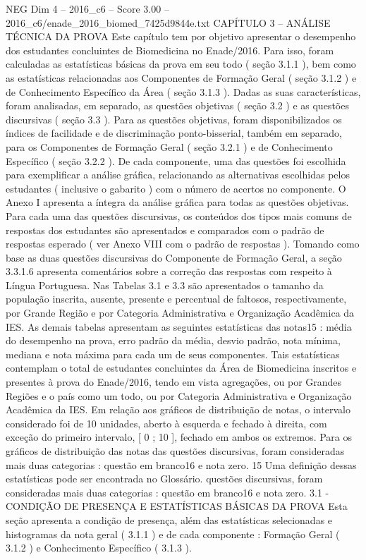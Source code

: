 \begin{textsample}{NEG Dim 4 – 2016\_c6 – Score 3.00 – 2016\_c6/enade\_2016\_biomed\_7425d9844e.txt}  \label{ex:f4_neg_301}
CAPÍTULO 3 – ANÁLISE TÉCNICA DA PROVA Este capítulo tem por objetivo apresentar o desempenho dos estudantes concluintes de Biomedicina no Enade/2016.
Para isso, foram calculadas as estatísticas básicas da prova em seu todo ( seção 3.1.1 ), bem como as estatísticas relacionadas aos Componentes de Formação Geral ( seção 3.1.2 ) e de Conhecimento Específico da Área ( seção 3.1.3 ).
Dadas as suas características, foram analisadas, em separado, as questões objetivas ( seção 3.2 ) e as questões discursivas ( seção 3.3 ).
Para as questões objetivas, foram disponibilizados os índices de facilidade e de discriminação ponto-bisserial, também em separado, para os Componentes de Formação Geral ( seção 3.2.1 ) e de Conhecimento Específico ( seção 3.2.2 ).
De cada componente, uma das questões foi escolhida para exemplificar a análise gráfica, relacionando as alternativas escolhidas pelos estudantes ( inclusive o gabarito ) com o número de acertos no componente.
O Anexo I apresenta a íntegra da análise gráfica para todas as questões objetivas.
Para cada uma das questões discursivas, os conteúdos dos tipos mais comuns de respostas dos estudantes são apresentados e comparados com o padrão de respostas esperado ( ver Anexo VIII com o padrão de respostas ).
Tomando como base as duas questões discursivas do Componente de Formação Geral, a seção 3.3.1.6 apresenta comentários sobre a correção das respostas com respeito à Língua Portuguesa.
Nas Tabelas 3.1 e 3.3 são apresentados o tamanho da população inscrita, ausente, presente e percentual de faltosos, respectivamente, por Grande Região e por Categoria Administrativa e Organização Acadêmica da IES.
As demais tabelas apresentam as seguintes estatísticas das notas15 : média do desempenho na prova, erro padrão da média, desvio padrão, nota mínima, mediana e nota máxima para cada um de seus componentes.
Tais estatísticas contemplam o total de estudantes concluintes da Área de Biomedicina inscritos e presentes à prova do Enade/2016, tendo em vista agregações, ou por Grandes Regiões e o país como um todo, ou por Categoria Administrativa e Organização Acadêmica da IES.
Em relação aos gráficos de distribuição de notas, o intervalo considerado foi de 10 unidades, aberto à esquerda e fechado à direita, com exceção do primeiro intervalo, [ 0 ; 10 ], fechado em ambos os extremos.
Para os gráficos de distribuição das notas das questões discursivas, foram consideradas mais duas categorias : questão em branco16 e nota zero. 15 Uma definição dessas estatísticas pode ser encontrada no Glossário. questões discursivas, foram consideradas mais duas categorias : questão em branco16 e nota zero. 3.1 - CONDIÇÃO DE PRESENÇA E ESTATÍSTICAS BÁSICAS DA PROVA Esta seção apresenta a condição de presença, além das estatísticas selecionadas e histogramas da nota geral ( 3.1.1 ) e de cada componente : Formação Geral ( 3.1.2 ) e Conhecimento Específico ( 3.1.3 ).

\end{textsample}
